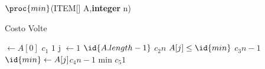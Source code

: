 \begin{algorithm}
\caption{$\proc{min}$(ITEM[] A,\textbf{integer} n)} \qquad \qquad Costo \quad Volte
\end{algorithm}
\begin{codebox}
  \li {} $\gets A[0]$ \>\>\>\>\>\> $c_1$ \>\>\> $1$
  \li \For j $\gets 1$ \To $\id{A.length-1}$ \>\>\>\>\>$c_2$\>\>\>$n$
      \Do
  \li        \If $A[j] \leq \id{min}$ \>\>\>\>\>$c_3$\>\>\>$n-1$
\li             \Then
                    $\id{min} \gets A[j]$\>\>\>\>$c_4$\>\>\>$n-1$
             \End
      \End
  \li \Return min \>\>\>\>\>\>$c_5$\>\>\>$1$
\end{codebox}
